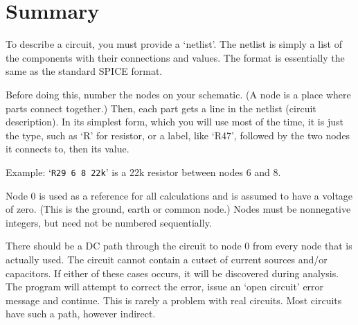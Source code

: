 %
%
%
%
\section{Summary}

 To describe a circuit, you must provide a `netlist'.  The netlist is simply
a list of the components with their connections and values.  The format is
essentially the same as the standard SPICE format.

Before doing this, number the nodes on your schematic.  (A node is a place
where parts connect together.)  Then, each part gets a line in the netlist
(circuit description).  In its simplest form, which you will use most of the
time, it is just the type, such as `R' for resistor, or a label, like `R47',
followed by the two nodes it connects to, then its value.

Example:  `{\tt R29 6 8 22k}' is a 22k resistor between nodes 6 and 8.

 Node 0 is used as a reference for all calculations and is assumed to have a
voltage of zero.  (This is the ground, earth or common node.)  Nodes must be
nonnegative integers, but need not be numbered sequentially.

 There should be a DC path through the circuit to node 0 from every node
that is actually used.  The circuit cannot contain a cutset of current
sources and/or capacitors.  If either of these cases occurs, it will be
discovered during analysis.  The program will attempt to correct the error,
issue an `open circuit' error message and continue.  This is rarely a
problem with real circuits.  Most circuits have such a path, however
indirect.

